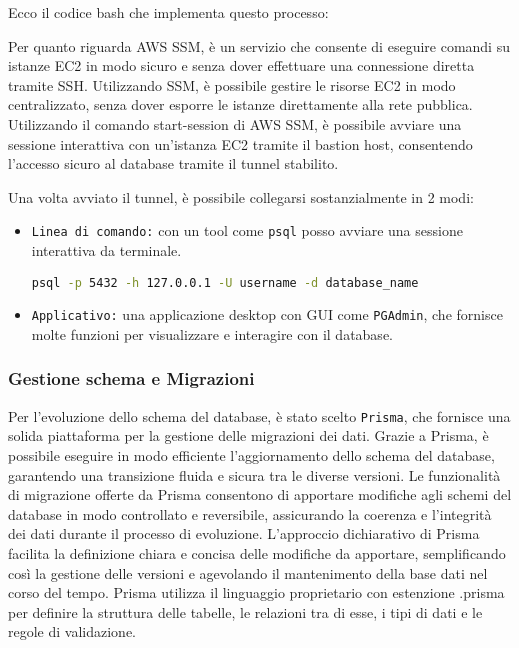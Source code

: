 Ecco il codice bash che implementa questo processo:



Per quanto riguarda AWS SSM, è un servizio che consente di eseguire comandi su istanze EC2 in modo sicuro e senza dover effettuare una connessione diretta tramite SSH. Utilizzando SSM, è possibile gestire le risorse EC2 in modo centralizzato, senza dover esporre le istanze direttamente alla rete pubblica. Utilizzando il comando start-session di AWS SSM, è possibile avviare una sessione interattiva con un'istanza EC2 tramite il bastion host, consentendo l'accesso sicuro al database tramite il tunnel stabilito.

\vspace{0,3cm}

Una volta avviato il tunnel, è possibile collegarsi sostanzialmente in 2 modi:
\begin{itemize}
    \item \texttt{Linea di comando:} con un tool come \texttt{psql} posso avviare una sessione interattiva da terminale.
    
    \lstinline[language=Bash]{psql -p 5432 -h 127.0.0.1 -U username -d database_name}

    \item \texttt{Applicativo:} una applicazione desktop con GUI come \texttt{PGAdmin}, che fornisce molte funzioni per visualizzare e interagire con il database.
\end{itemize}


\subsubsection{Gestione schema e Migrazioni}
Per l'evoluzione dello schema del database, è stato scelto \texttt{Prisma}, che fornisce una solida piattaforma per la gestione delle migrazioni dei dati. Grazie a Prisma, è possibile eseguire in modo efficiente l'aggiornamento dello schema del database, garantendo una transizione fluida e sicura tra le diverse versioni.
Le funzionalità di migrazione offerte da Prisma consentono di apportare modifiche agli schemi del database in modo controllato e reversibile, assicurando la coerenza e l'integrità dei dati durante il processo di evoluzione. L'approccio dichiarativo di Prisma facilita la definizione chiara e concisa delle modifiche da apportare, semplificando così la gestione delle versioni e agevolando il mantenimento della base dati nel corso del tempo. Prisma utilizza il linguaggio proprietario con estenzione .prisma per definire  la struttura delle tabelle, le relazioni tra di esse, i tipi di dati e le regole di validazione.


